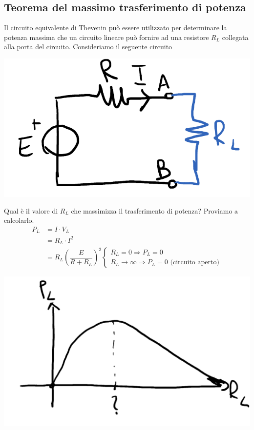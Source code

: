 \documentclass{article}
\begin{document}
\subsection{Teorema del massimo trasferimento di potenza}
Il circuito equivalente di Thevenin può essere utilizzato per determinare la potenza massima che un circuito lineare può fornire ad una resistore $R_L$ collegata alla porta del circuito.
Consideriamo il seguente circuito
\begin{center}
    \includegraphics[scale=0.3]{Image/T_Massima_Potenza_0.png}
\end{center}
Qual è il valore di $R_L$ che massimizza il trasferimento di potenza? Proviamo a calcolarlo.
\begin{align*}
    P_L &= I \cdot V_L\\
    &=R_L \cdot I^2\\
    &=R_L \left( \dfrac{E}{R+R_L} \right)^2 
    \begin{cases}
        R_L=0 \Rightarrow P_L=0\\
        R_L \rightarrow \infty \Rightarrow P_L=0 \text{ (circuito aperto)}
    \end{cases}
\end{align*}
\begin{center}
    \includegraphics[scale=0.25]{Image/T_Massima_Potenza_1.png}
\end{center}
\end{document}
